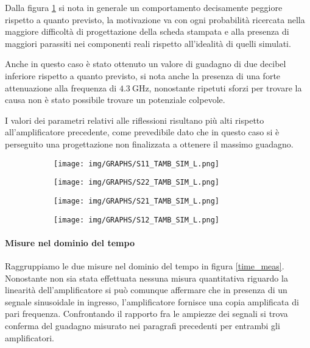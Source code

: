 \documentclass[12pt,oneside]{book}
\begin{document}
Dalla figura \ref{amb_l} si nota in generale un comportamento decisamente peggiore rispetto a quanto previsto, la motivazione va con ogni probabilità ricercata nella maggiore difficoltà di progettazione della scheda stampata e alla presenza di maggiori parassiti nei componenti reali rispetto all'idealità di quelli simulati.

Anche in questo caso è stato ottenuto un valore di guadagno di due decibel inferiore rispetto a quanto previsto, si nota anche la presenza di una forte attenuazione alla frequenza di $\SI{4.3}{\giga\hertz}$, nonostante ripetuti sforzi per trovare la causa non è stato possibile trovare un potenziale colpevole.

I valori dei parametri relativi alle riflessioni risultano più alti rispetto all'amplificatore precedente, come prevedibile dato che in questo caso si è perseguito una progettazione non finalizzata a ottenere il massimo guadagno.

\begin{figure}[!htbp]
    \centering
    \begin{subfigure}[t]{0.48\textwidth}
        \centering
        \texttt{[image: img/GRAPHS/S11\_TAMB\_SIM\_L.png]}
        \caption{}
    \end{subfigure}
    \hfill
    \begin{subfigure}[t]{0.48\textwidth}
        \centering
        \texttt{[image: img/GRAPHS/S22\_TAMB\_SIM\_L.png]}
        \caption{}
    \end{subfigure}
    \hfill
    \centering
    \begin{subfigure}[t]{0.48\textwidth}
        \centering
        \texttt{[image: img/GRAPHS/S21\_TAMB\_SIM\_L.png]}
        \caption{}
    \end{subfigure}
    \hfill
    \begin{subfigure}[t]{0.48\textwidth}
        \centering
        \texttt{[image: img/GRAPHS/S12\_TAMB\_SIM\_L.png]}
        \caption{}
    \end{subfigure}
    \caption{}
    \label{amb_l}
\end{figure}

\paragraph{Misure nel dominio del tempo}

Raggruppiamo le due misure nel dominio del tempo in figura \ref{time_meas}.
Nonostante non sia stata effettuata nessuna misura quantitativa riguardo la linearità dell'amplificatore si può comunque affermare che in presenza di un segnale sinusoidale in ingresso, l'amplificatore fornisce una copia amplificata di pari frequenza. Confrontando il rapporto fra le ampiezze dei segnali si trova conferma del guadagno misurato nei paragrafi precedenti per entrambi gli amplificatori.
\end{document}
